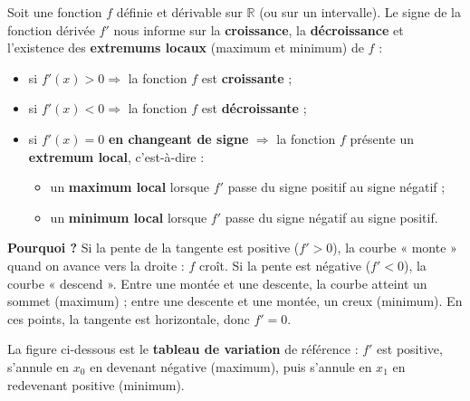 \documentclass[11pt,a4paper]{article}
\newcommand{\R}{\mathbb{R}}
\begin{document}
\begin{theoreme}
Soit une fonction $f$ définie et dérivable sur $\R$ (ou sur un intervalle). Le signe de la fonction
dérivée $f'$ nous informe sur la \textbf{croissance}, la \textbf{décroissance} et l'existence des
\textbf{extremums locaux} (maximum et minimum) de $f$ :
\begin{itemize}[leftmargin=1.7em,topsep=3pt,itemsep=2pt]
  \item si $f'(x)>0 \Rightarrow$ la fonction $f$ est \textbf{croissante} ;
  \item si $f'(x)<0 \Rightarrow$ la fonction $f$ est \textbf{décroissante} ;
  \item si $f'(x)=0$ \textbf{en changeant de signe} $\Rightarrow$ la fonction $f$ présente un
        \textbf{extremum local}, c'est-à-dire :
        \begin{itemize}[leftmargin=1.5em,topsep=2pt,itemsep=1pt]
          \item un \textbf{maximum local} lorsque $f'$ passe du signe positif au signe négatif ;
          \item un \textbf{minimum local} lorsque $f'$ passe du signe négatif au signe positif.
        \end{itemize}
\end{itemize}
\end{theoreme}

\noindent \textbf{Pourquoi ?} Si la pente de la tangente est positive ($f'>0$), la courbe « monte »
quand on avance vers la droite : $f$ croît. Si la pente est négative ($f'<0$), la courbe « descend ».
Entre une montée et une descente, la courbe atteint un sommet (maximum) ; entre une descente et une
montée, un creux (minimum). En ces points, la tangente est horizontale, donc $f'=0$.

\medskip
La figure ci-dessous est le \textbf{tableau de variation} de référence : $f'$ est positive, s'annule
en $x_0$ en devenant négative (maximum), puis s'annule en $x_1$ en redevenant positive (minimum).
\end{document}
